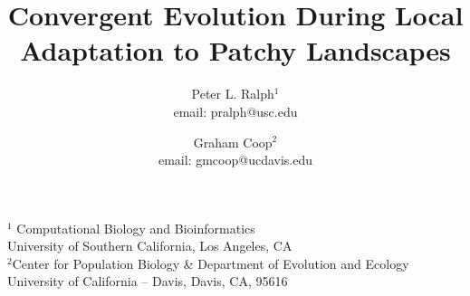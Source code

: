 \documentclass{article}
\date{}
\title 
{
Convergent Evolution During Local Adaptation to Patchy Landscapes
}
\author{Peter L. Ralph$^1$ \\ email: pralph@usc.edu  \and Graham Coop$^2$ \\ email: gmcoop@ucdavis.edu }
\begin{document}
\maketitle
\begin{center}

$^1$ Computational Biology and Bioinformatics \\ 
University of Southern California, Los Angeles, CA \\
$^2$Center for Population Biology \& Department of Evolution and Ecology \\ 
University of California -- Davis, Davis, CA, 95616
\end{center}

\end{document}
